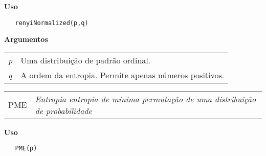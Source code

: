 \textbf{Uso}

\begin{lstlisting}
   renyiNormalized(p,q)
\end{lstlisting}

\vspace{0.5cm}

\textbf{Argumentos}

\begin{table}[!ht]
\begin{center}
\begin{tabularx}{\textwidth}{X X}
\hspace{0.5cm} \textit{p} \vspace{0.5cm}& Uma distribuição de padrão ordinal.\vspace{0.5cm}\\
\hspace{0.5cm} \textit{q} \vspace{0.5cm}& A ordem da entropia. Permite apenas números positivos.\vspace{0.5cm}\\
\end{tabularx}
\end{center}
\end{table} 


\hrulefill   

\begin{table}[!ht]
\begin{center}
\begin{tabularx}{\textwidth}{ X X}
\hspace{0.5cm} PME & \textit{Entropia entropia de mínima permutação de uma distribuição de probabilidade}\\
\end{tabularx}
\end{center}
\end{table} 

\vspace{-0.5cm}

\hrulefill  

\vspace{0.5cm}

\textbf{Uso}

\begin{lstlisting}
   PME(p)
\end{lstlisting}

\vspace{0.5cm}

